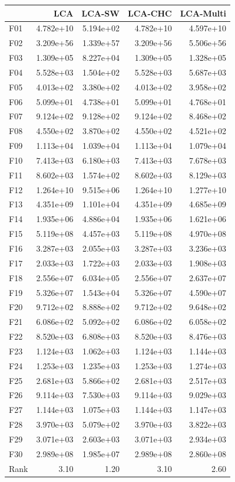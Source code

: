 \begin{tabular}{lrrrr}
\toprule
 & LCA & LCA-SW & LCA-CHC & LCA-Multi \\
\midrule
F01 & 4.782e+10 & 5.194e+02 & 4.782e+10 & 4.597e+10 \\
F02 & 3.209e+56 & 1.339e+57 & 3.209e+56 & 5.506e+56 \\
F03 & 1.309e+05 & 8.227e+04 & 1.309e+05 & 1.328e+05 \\
F04 & 5.528e+03 & 1.504e+02 & 5.528e+03 & 5.687e+03 \\
F05 & 4.013e+02 & 3.380e+02 & 4.013e+02 & 3.958e+02 \\
F06 & 5.099e+01 & 4.738e+01 & 5.099e+01 & 4.768e+01 \\
F07 & 9.124e+02 & 9.128e+02 & 9.124e+02 & 8.468e+02 \\
F08 & 4.550e+02 & 3.870e+02 & 4.550e+02 & 4.521e+02 \\
F09 & 1.113e+04 & 1.039e+04 & 1.113e+04 & 1.079e+04 \\
F10 & 7.413e+03 & 6.180e+03 & 7.413e+03 & 7.678e+03 \\
F11 & 8.602e+03 & 1.574e+02 & 8.602e+03 & 8.129e+03 \\
F12 & 1.264e+10 & 9.515e+06 & 1.264e+10 & 1.277e+10 \\
F13 & 4.351e+09 & 1.101e+04 & 4.351e+09 & 4.685e+09 \\
F14 & 1.935e+06 & 4.886e+04 & 1.935e+06 & 1.621e+06 \\
F15 & 5.119e+08 & 4.457e+03 & 5.119e+08 & 4.970e+08 \\
F16 & 3.287e+03 & 2.055e+03 & 3.287e+03 & 3.236e+03 \\
F17 & 2.033e+03 & 1.722e+03 & 2.033e+03 & 1.908e+03 \\
F18 & 2.556e+07 & 6.034e+05 & 2.556e+07 & 2.637e+07 \\
F19 & 5.326e+07 & 1.543e+04 & 5.326e+07 & 4.590e+07 \\
F20 & 9.712e+02 & 8.888e+02 & 9.712e+02 & 9.648e+02 \\
F21 & 6.086e+02 & 5.092e+02 & 6.086e+02 & 6.058e+02 \\
F22 & 8.520e+03 & 6.808e+03 & 8.520e+03 & 8.476e+03 \\
F23 & 1.124e+03 & 1.062e+03 & 1.124e+03 & 1.144e+03 \\
F24 & 1.253e+03 & 1.235e+03 & 1.253e+03 & 1.274e+03 \\
F25 & 2.681e+03 & 5.866e+02 & 2.681e+03 & 2.517e+03 \\
F26 & 9.114e+03 & 7.530e+03 & 9.114e+03 & 9.029e+03 \\
F27 & 1.144e+03 & 1.075e+03 & 1.144e+03 & 1.147e+03 \\
F28 & 3.970e+03 & 5.079e+02 & 3.970e+03 & 3.822e+03 \\
F29 & 3.071e+03 & 2.603e+03 & 3.071e+03 & 2.934e+03 \\
F30 & 2.989e+08 & 1.985e+07 & 2.989e+08 & 2.860e+08 \\
\midrule
Rank & 3.10 & 1.20 & 3.10 & 2.60 \\
\bottomrule
\end{tabular}